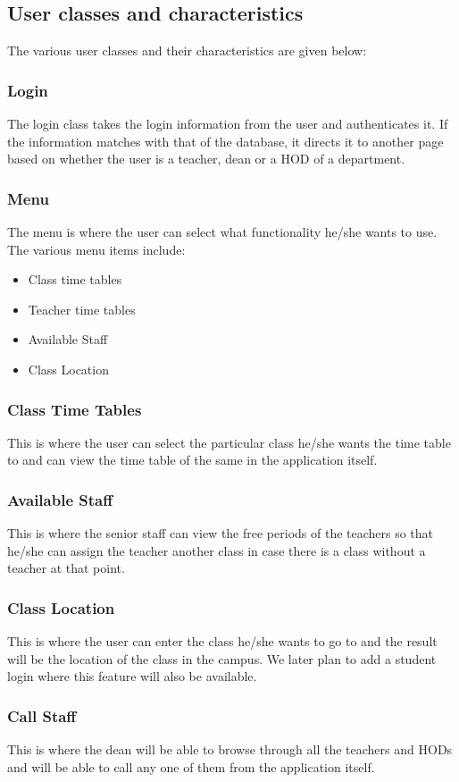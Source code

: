 \documentclass[BTech]{srmuthesis}
\begin{document}
\subsection{User classes and characteristics}
The various user classes and their characteristics are given below:

\subsubsection{Login}
The login class takes the login information from the user and authenticates it. If the information matches with that of the database, it directs it to another page based on whether the user is a teacher, dean or a HOD of a department.                          
\subsubsection{Menu}
The menu is where the user can select what functionality he/she wants to use. The various menu items include:
\begin{itemize}
\item Class time tables
\item Teacher time tables
\item Available Staff
\item Class Location
\end{itemize}

\subsubsection{Class Time Tables}
This is where the user can select the particular class he/she wants the time table to and can view the time table of the same in the application itself.
\subsubsection{Available Staff}
This is where the senior staff can view the free periods of the teachers so that he/she can assign the teacher another class in case there is a class without a teacher at that point.
\subsubsection{Class Location}
This is where the user can enter the class he/she wants to go to and the result will be the location of the class in the campus. We later plan to add a student login where this feature will also be available.
\subsubsection{Call Staff}
This is where the dean will be able to browse through all the teachers and HODs and will be able to call any one of them from the application itself.
\end{document}
